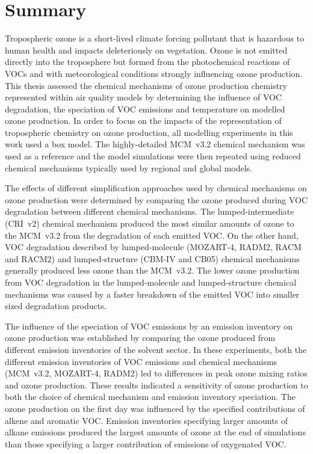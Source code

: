 \section{Summary}
Tropospheric ozone is a short-lived climate forcing pollutant that is hazardous to human health and impacts deleteriously on vegetation.
Ozone is not emitted directly into the troposphere but formed from the photochemical reactions of VOCs and  with meteorological conditions strongly influencing ozone production.
This thesis assessed the chemical mechanisms of ozone production chemistry represented within air quality models by determining the influence of VOC degradation, the speciation of VOC emissions and temperature on modelled ozone production.
In order to focus on the impacts of the representation of tropospheric chemistry on ozone production, all modelling experiments in this work used a box model.
The highly-detailed MCM~v3.2 chemical mechanism was used as a reference and the model simulations were then repeated using reduced chemical mechanisms typically used by regional and global models.

The effects of different simplification approaches used by chemical mechanisms on ozone production were determined by comparing the ozone produced during VOC degradation between different chemical mechanisms.
The lumped-intermediate (CRI~v2) chemical mechanism produced the most similar amounts of ozone to the MCM~v3.2 from the degradation of each emitted VOC.
On the other hand, VOC degradation described by lumped-molecule (MOZART-4, RADM2, RACM and RACM2) and lumped-structure (CBM-IV and CB05) chemical mechanisms generally produced less ozone than the MCM~v3.2.
The lower ozone production from VOC degradation in the lumped-molecule and lumped-structure chemical mechanisms was caused by a faster breakdown of the emitted VOC into smaller sized degradation products.

The influence of the speciation of VOC emissions by an emission inventory on ozone production was established by comparing the ozone produced from different emission inventories of the solvent sector.
In these experiments, both the different emission inventories of VOC emissions and chemical mechanisms (MCM~v3.2, MOZART-4, RADM2) led to differences in peak ozone mixing ratios and ozone production.
These results indicated a sensitivity of ozone production to both the choice of chemical mechanism and emission inventory speciation.
The ozone production on the first day was influenced by the specified contributions of alkene and aromatic VOC.
Emission inventories specifying larger amounts of alkane emissions produced the largest amounts of ozone at the end of simulations than those specifying a larger contribution of emissions of oxygenated VOC.

